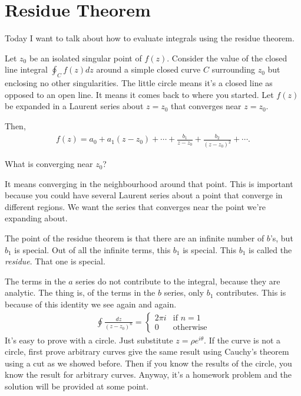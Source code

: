 \section{Residue Theorem}
Today I want to talk about how to evaluate integrals using the residue theorem.

Let $z_0$ be an isolated singular point of $f(z)$.
Consider the value of the closed line integral $\oint_C f(z) dz$
around a simple closed curve $C$ surrounding $z_0$
but enclosing no other singularities.
The little circle means it's a closed line as opposed to an open line.
It means it comes back to where you started.
Let $f(z)$ be expanded in a Laurent series about $z=z_0$ that converges near
$z=z_0$.

Then,
\begin{align}
    f(z) = a_0 + a_1(z - z_0) + \cdots
    + \frac{b_1}{z - z_0} + \frac{b_2}{(z - z_0)^2} + \cdots.
\end{align}

\begin{question}
    What is converging near $z_0$?
\end{question}
It means converging in the neighbourhood around that point.
This is important because you could have several Laurent series about a point
that converge in different regions.
We want the series that converges near the point we're expanding about.

The point of the residue theorem is that there are an infinite number of $b$'s,
but $b_1$ is special.
Out of all the infinite terms, this $b_1$ is special.
This $b_1$ is called the \emph{residue}.
That one is special.

The terms in the $a$ series do not contribute to the integral,
because they are analytic.
The thing is, of the terms in the $b$ series,
only $b_1$ contributes.
This is because of this identity we see again and again.
\begin{align}
    \oint \frac{dz}{\left( z - z_0 \right)^n} =
    \begin{cases}
        2\pi i & \text{if } n =1\\
        0 & \text{otherwise}
    \end{cases}
\end{align}
It's easy to prove with a circle.
Just substitute $z=\rho e^{i\theta}$.
If the curve is not a circle,
first prove arbitrary curves give the same result
using Cauchy's theorem using a cut as we showed before.
Then if you know the results of the circle,
you know the result for arbitrary curves.
Anyway,
it's a homework problem and the solution will be provided at some point.

